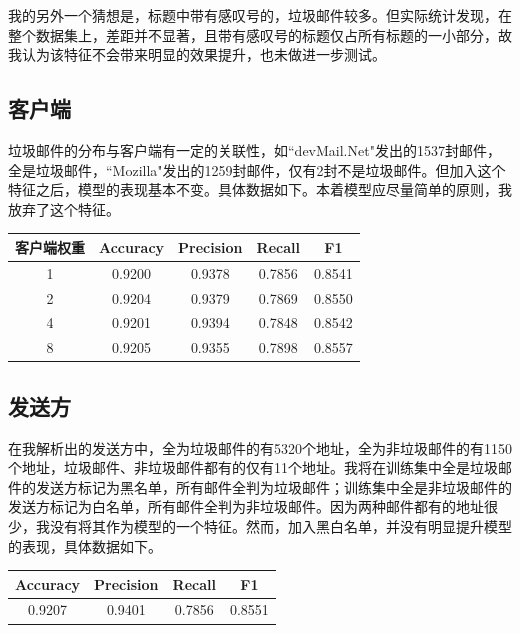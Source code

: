 \documentclass{article}
\begin{document}
我的另外一个猜想是，标题中带有感叹号的，垃圾邮件较多。但实际统计发现，在整个数据集上，差距并不显著，且带有感叹号的标题仅占所有标题的一小部分，故我认为该特征不会带来明显的效果提升，也未做进一步测试。

\subsection{客户端}
垃圾邮件的分布与客户端有一定的关联性，如``devMail.Net"发出的1537封邮件，全是垃圾邮件，``Mozilla"发出的1259封邮件，仅有2封不是垃圾邮件。但加入这个特征之后，模型的表现基本不变。具体数据如下。本着模型应尽量简单的原则，我放弃了这个特征。
\begin{table}[h]
\center
\label{tab:meta-mailer}
\begin{tabular}[]{|c|c|c|c|c|}
\hline
客户端权重&Accuracy & Precision & Recall & F1 \\ \hline
1& 0.9200 & 0.9378 & 0.7856 & 0.8541 \\ \hline
2& 0.9204 & 0.9379 & 0.7869 & 0.8550 \\ \hline
4& 0.9201 & 0.9394 & 0.7848 & 0.8542 \\ \hline
8& 0.9205 & 0.9355 & 0.7898 & 0.8557 \\ \hline

\end{tabular}
\end{table}

\subsection{发送方}
在我解析出的发送方中，全为垃圾邮件的有5320个地址，全为非垃圾邮件的有1150个地址，垃圾邮件、非垃圾邮件都有的仅有11个地址。我将在训练集中全是垃圾邮件的发送方标记为黑名单，所有邮件全判为垃圾邮件；训练集中全是非垃圾邮件的发送方标记为白名单，所有邮件全判为非垃圾邮件。因为两种邮件都有的地址很少，我没有将其作为模型的一个特征。然而，加入黑白名单，并没有明显提升模型的表现，具体数据如下。
\begin{table}[h]
\center
\label{tab:meta-sender}
\begin{tabular}[]{|c|c|c|c|}
\hline
Accuracy & Precision & Recall & F1 \\ \hline
0.9207 & 0.9401 & 0.7856 & 0.8551 \\ \hline
\end{tabular}
\end{table}
\end{document}
